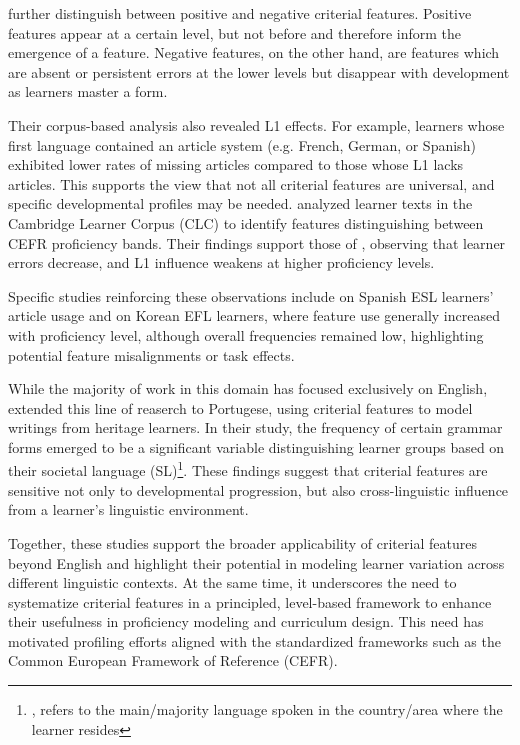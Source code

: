 \citet{Hawkins_Buttery_2010} further distinguish between positive and negative criterial features.
Positive features appear at a certain level, but not before and therefore inform the emergence of a
feature.
Negative features, on the other hand, are features which are absent or persistent errors at the lower levels but
disappear with development as learners master a form.

Their corpus-based analysis also revealed L1 effects. For example, learners whose
first language contained an article system (e.g. French, German, or Spanish) exhibited lower rates of missing articles
compared to those whose L1 lacks articles. This supports the view that not all criterial features are universal, and
specific developmental profiles may be needed. \citet{salamoura2010} analyzed learner texts in the Cambridge Learner
Corpus (CLC) to identify features distinguishing between CEFR proficiency bands. Their findings support those of \citet{Hawkins_Buttery_2010,diez-bedmar2015,Kim2021}, observing that learner errors decrease, and L1 influence weakens at higher proficiency levels.

Specific studies reinforcing these observations include \citet{diez-bedmar2015} on Spanish ESL learners' article
usage and \citet{Kim2021} on Korean EFL learners, where feature use generally increased with proficiency level,
although overall frequencies remained low, highlighting potential feature misalignments or task effects.

While the majority of work in this domain has focused exclusively on English, \citet{akef2025} extended
this line of reaserch to Portugese, using criterial
features to model writings from heritage learners. In their study, the frequency of certain grammar forms emerged to
be a significant variable distinguishing learner groups based on their societal language (SL)\footnote{, refers to the main/majority language spoken in the country/area where
the learner resides}. These findings suggest that criterial features are sensitive not only to developmental
progression, but also cross-linguistic influence from a learner's linguistic environment.

Together, these studies support the broader applicability of criterial features beyond English and highlight
their
potential in modeling learner variation across different linguistic contexts. At the same time, it underscores the
need to systematize criterial features in a principled, level-based framework to enhance their usefulness in
proficiency modeling and curriculum design. This need has motivated profiling efforts
\citep{Saville2010}
aligned
with
the standardized frameworks such as the Common European Framework of Reference (CEFR).



